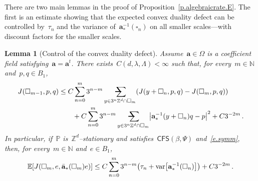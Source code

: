 \documentclass[11pt,twoside]{article} %
\makeatletter
\let\oldsquare\square %
\renewcommand{\square}{\oldsquare}
\numberwithin{equation}{section}
\newtheorem{lemma}[theorem]{Lemma}
\theoremstyle{definition}
\let\originalleft\left
\let\originalright\right
\renewcommand{\left}{\mathopen{}\mathclose\bgroup\originalleft}
\renewcommand{\right}{\aftergroup\egroup\originalright}
\newcommand*{\N}{\ensuremath{\mathbb{N}}}
\newcommand*{\Zd}{\ensuremath{\mathbb{Z}^d}}
\renewcommand{\a}{\mathbf{a}}
\newcommand{\ahom}{\bar{\a}}
\newcommand{\cu}{\square}
\renewcommand{\P}{\mathbb{P}}
\newcommand{\E}{\mathbb{E}}
\DeclareMathOperator{\var}{var}
\newcommand{\avsum}{\mathop{\mathpalette\avsuminner\relax}\displaylimits}
\newcommand\avsuminner[2]{%
  {\sbox0{$\m@th#1\sum$}%
   \vphantom{\usebox0}%
   \ooalign{%
     \hidewidth
     \smash{\,\rule[.23em]{8.8pt}{1.1pt} \relax}%
     \hidewidth\cr
   ~$\m@th#1\sum$\cr
   }%
  }%
}
\newcommand{\CFS}{\mathsf{CFS}}
\makeatother
\begin{document}
\smallskip

There are two main lemmas in the proof of Proposition~\ref{p.algebraicrate.E}. The first is an estimate showing that the expected convex duality defect can be controlled by~$\tau_n$ and the variance of~$\a_*^{-1}(\cu_n)$ on all smaller scales---with discount factors for the smaller scales. 

\begin{lemma}
[Control of the convex duality defect]
\label{l.flatness.rules}
Assume~$\a\in\Omega$ is a coefficient field satisfying~$\a=\a^t$. 
There exists~$C(d,\lambda,\Lambda)<\infty$ such that, for every~$m\in\N$ and~$p,q\in B_1$, 
\begin{align}
\label{e.flatness.quenched}
J(\cu_{m-1},p,q) 
&
\leq 
C
\sum_{n=0}^{{m}} 3^{n-m} 
\avsum_{y\in 3^{n}\Zd\cap \cu_m} 
( J(y+\cu_{n},p,q) - J (\cu_m,p,q) )
\notag \\ & \qquad 
+
C\sum_{n=0}^{{m}} 3^{n-m} 
\avsum_{y\in 3^n\Zd\cap \cu_{m}} 
\left| \a_*^{-1}(y+\cu_n) q - p\right|^2
+C3^{-2m}
\,.
\end{align}
In particular, if~$\P$ is~$\Zd$--stationary and satisfies~$\CFS(\beta,\Psi)$ and~\eqref{e.symm}, then, for every~$m\in\N$ and~$e\in  B_1$, 
\begin{align}
\label{e.flatness.rules}
\E \left[ J(\cu_m,e,\ahom_*(\cu_m)e) \right]
\leq 
C 
\sum_{n=0}^{m} 3^{n-m} 
\left( \tau_n + \var\left[ \a_*^{-1}(\cu_n) \right] \right)
+C 3^{-2m}\,. 
\end{align}
\end{lemma}
\end{document}
